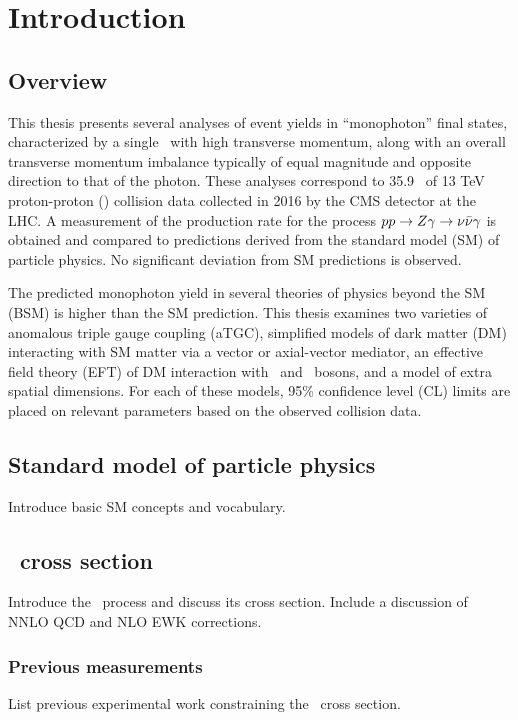 \documentclass[oneside, letterpaper, 12pt, oldfontcommands]{memoir}
\begin{document}
\mainmatter

\chapter{Introduction} \label{sec:introduction}
\section{Overview} \label{sec:introduction_overview}
This thesis presents several analyses of event
yields in ``monophoton'' final states, characterized by a single \Pgamma\ with high transverse
momentum, along with an overall transverse momentum imbalance typically of equal magnitude and opposite direction to
that of the photon.
These analyses correspond to 35.9 \fbinv\ of 13 TeV proton-proton (\Pp\Pp) collision data collected in 2016 by the CMS
detector at the LHC. A measurement of the production rate for the process $pp \to Z\gamma \to \nu\bar{\nu}\gamma$ is obtained
and compared to predictions derived from the standard model (SM) of particle physics. No significant deviation from SM
predictions is observed.

The predicted monophoton yield in several theories of physics beyond the SM (BSM) is higher than the SM prediction.
This thesis examines two varieties of anomalous triple gauge coupling (aTGC), simplified models of dark matter (DM)
interacting with SM matter via a vector or axial-vector mediator, an effective field theory (EFT) of DM interaction
with  \Pgamma\ and \PZ\ bosons, and a model of extra spatial dimensions. For each of these models, 95\% confidence level (CL)
limits are placed on relevant parameters based on the observed collision data.

\section{Standard model of particle physics} \label{sec:introduction_standard_model}
Introduce basic SM concepts and vocabulary.

\section{\zinvg\ cross section} \label{sec:introduction_znng}
Introduce the \zinvg\ process and discuss its cross section. Include a discussion of NNLO QCD and NLO EWK corrections.
\subsection{Previous measurements}
List previous experimental work constraining the \zinvg\ cross section.
\end{document}
